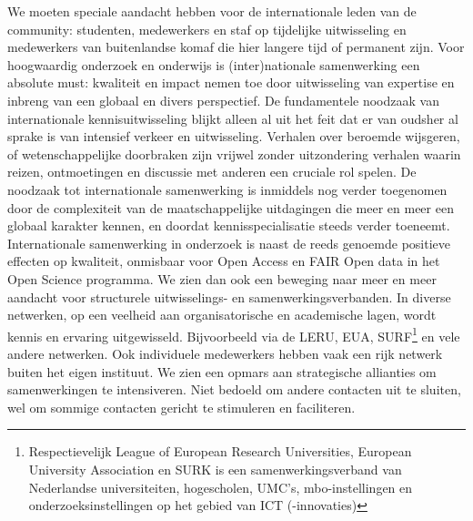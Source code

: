 \documentclass{jote-book}
\begin{document}
	We moeten speciale aandacht hebben voor de internationale leden van de community: studenten, medewerkers en staf op tijdelijke uitwisseling en medewerkers van buitenlandse komaf die hier langere tijd of permanent zijn. Voor hoogwaardig onderzoek en onderwijs is (inter)nationale samenwerking een absolute must: kwaliteit en impact nemen toe door uitwisseling van expertise en inbreng van een globaal en divers perspectief. De fundamentele noodzaak van internationale kennisuitwisseling blijkt alleen al uit het feit dat er van oudsher al sprake is van intensief verkeer en uitwisseling. Verhalen over beroemde wijsgeren, of wetenschappelijke doorbraken zijn vrijwel zonder uitzondering verhalen waarin reizen, ontmoetingen en discussie met anderen een cruciale rol spelen. De noodzaak tot internationale samenwerking is inmiddels nog verder toegenomen door de complexiteit van de maatschappelijke uitdagingen die meer en meer een globaal karakter kennen, en doordat kennisspecialisatie steeds verder toeneemt. Internationale samenwerking in onderzoek is naast de reeds genoemde positieve effecten op kwaliteit, onmisbaar voor Open Access en FAIR Open data in het Open Science programma. We zien dan ook een beweging naar meer en meer aandacht voor structurele uitwisselings- en samenwerkingsverbanden. In diverse netwerken, op een veelheid aan organisatorische en academische lagen, wordt kennis en ervaring uitgewisseld. Bijvoorbeeld via de LERU, EUA, SURF\footnote{Respectievelijk League of European Research Universities, European University Association en SURK is een samenwerkingsverband van Nederlandse universiteiten, hogescholen, UMC's, mbo-instellingen en onderzoeksinstellingen op het gebied van ICT (-innovaties)} en vele andere netwerken. Ook individuele medewerkers hebben vaak een rijk netwerk buiten het eigen instituut. We zien een opmars aan strategische allianties om samenwerkingen te intensiveren. Niet bedoeld om andere contacten uit te sluiten, wel om sommige contacten gericht te stimuleren en faciliteren.
\end{document}
